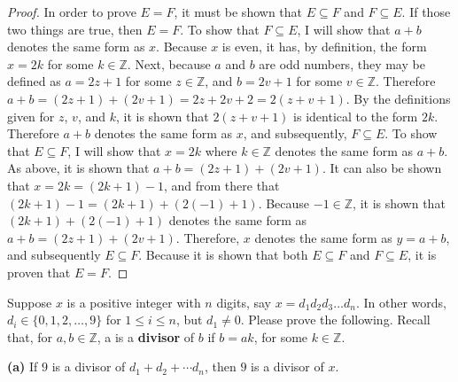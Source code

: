 \documentclass[12pt]{article}
\newenvironment{problem}[2][Problem]{\begin{trivlist}
\item[\hskip \labelsep {\bfseries #1}\hskip \labelsep {\bfseries #2.}]}{\end{trivlist}}
\begin{document}
\begin{proof}
In order to prove $E = F$, it must be shown that $E \subseteq F$ and $F \subseteq E$. If those two things are true, then $E = F$.
\newline
\newline
To show that $F \subseteq E$, I will show that $a + b$ denotes the same form as $x$. Because $x$ is even, it has, by definition, the form $x = 2k$ for some $k \in\mathbb{Z}$. Next, because $a$ and $b$ are odd numbers, they may be defined as 
$a = 2z + 1$ for some $z \in\mathbb{Z}$, and $b = 2v + 1$ for some $v \in\mathbb{Z}$. Therefore $a + b = (2z + 1) + (2v + 1) = 2z +2 v + 2 = 2(z + v + 1)$. By the definitions given for $z$, $v$, and $k$, it is shown that $2(z + v + 1)$ is identical to the form $2k$. Therefore $a + b$ denotes the same form as $x$, and subsequently, $F \subseteq E$.
\newline
\newline
To show that $E \subseteq F$, I will show that $x = 2k$ where $k \in\mathbb{Z}$ denotes the same form as $a + b$. As above, it is shown that $a + b = (2z + 1) + (2v + 1)$. It can also be shown that $x = 2k = (2k + 1) - 1$, and from there that $(2k + 1) - 1 = (2k + 1) + (2(-1) + 1)$. Because $-1 \in\mathbb{Z}$, it is shown that $(2k + 1) + (2(-1) + 1)$ denotes the same form as $a + b = (2z + 1) + (2v + 1)$. Therefore, $x$ denotes the same form as $y = a + b$, and subsequently $E \subseteq F$.
\newline
\newline
Because it is shown that both $E \subseteq F$ and $F \subseteq E$, it is proven that $E = F$.
\end{proof}

\begin{problem}{3}
Suppose $x$ is a positive integer with $n$ digits, say $x = d_1d_2d_3\ldots d_n$. In other words, $d_i \in \{0, 1, 2,\ldots, 9\}$ for $1\leq i \leq n$, but $d_1 \ne 0$. Please prove the following. Recall that, for $a, b \in\mathbb{Z}$, a is a \textbf{divisor} of $b$ if $b = ak$, for some $k\in\mathbb{Z}$.
\begin{description}
\item \textbf{(a)} If $9$ is a divisor of $d_1 + d_2 + \cdots d_n$, then $9$ is a divisor of $x$.
\end{description}
\end{problem}
\end{document}
